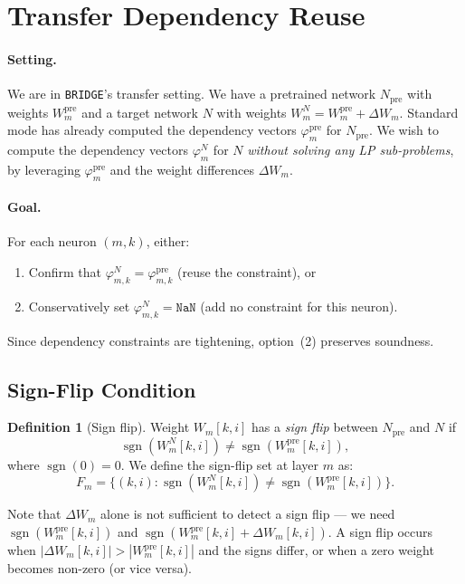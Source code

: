 \documentclass[11pt]{article}
\theoremstyle{definition}
\newtheorem{definition}[theorem]{Definition}
\newcommand{\tool}{\texttt{BRIDGE}\xspace}
\newcommand{\Npre}{N_{\mathrm{pre}}}
\newcommand{\sgn}{\operatorname{sgn}}
\begin{document}
\section{Transfer Dependency Reuse}
\label{sec:reuse}

\paragraph{Setting.}
We are in \tool's transfer setting. We have a pretrained network $\Npre$ with weights $W_m^{\mathrm{pre}}$ and a target network $N$ with weights $W_m^{N} = W_m^{\mathrm{pre}} + \Delta W_m$. Standard mode has already computed the dependency vectors $\varphi_m^{\mathrm{pre}}$ for $\Npre$. We wish to compute the dependency vectors $\varphi_m^{N}$ for $N$ \emph{without solving any LP sub-problems}, by leveraging $\varphi_m^{\mathrm{pre}}$ and the weight differences $\Delta W_m$.

\paragraph{Goal.}
For each neuron $(m,k)$, either:
\begin{enumerate}
  \item Confirm that $\varphi_{m,k}^{N} = \varphi_{m,k}^{\mathrm{pre}}$ (reuse the constraint), or
  \item Conservatively set $\varphi_{m,k}^{N} = \mathtt{NaN}$ (add no constraint for this neuron).
\end{enumerate}
Since dependency constraints are tightening, option~(2) preserves soundness.

\subsection{Sign-Flip Condition}

\begin{definition}[Sign flip]
  \label{def:sign-flip}
  Weight $W_m[k,i]$ has a \emph{sign flip} between $\Npre$ and $N$ if
  \[
    \sgn(W_m^{N}[k,i]) \neq \sgn(W_m^{\mathrm{pre}}[k,i]),
  \]
  where $\sgn(0) = 0$. We define the sign-flip set at layer $m$ as:
  \[
    F_m = \{(k,i) : \sgn(W_m^{N}[k,i]) \neq \sgn(W_m^{\mathrm{pre}}[k,i])\}.
  \]
\end{definition}

Note that $\Delta W_m$ alone is not sufficient to detect a sign flip --- we need $\sgn(W_m^{\mathrm{pre}}[k,i])$ and $\sgn(W_m^{\mathrm{pre}}[k,i] + \Delta W_m[k,i])$. A sign flip occurs when $|\Delta W_m[k,i]| > |W_m^{\mathrm{pre}}[k,i]|$ and the signs differ, or when a zero weight becomes non-zero (or vice versa).
\end{document}
